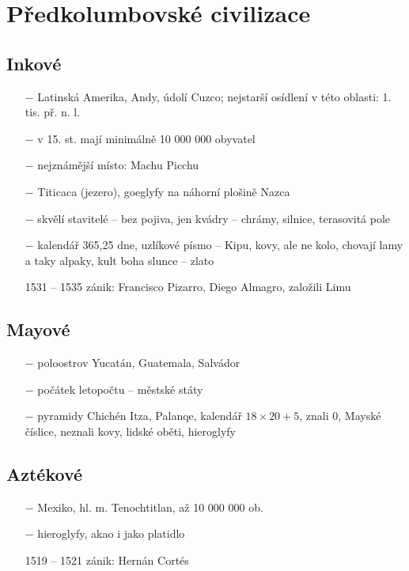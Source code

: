 \documentclass{article}
\begin{document}
\section*{Předkolumbovské civilizace}
\subsection*{Inkové}
\begin{itemize}
    \vspace{-0.5em}
    \setlength\itemsep{0.15em}
    \item[$-$] Latinská Amerika, Andy, údolí Cuzco; nejstarší osídlení v této oblasti: 1. tis. př. n. l.
    \item[$-$] v 15. st. mají minimálně 10 000 000 obyvatel
    \item[$-$] nejznámější místo: Machu Picchu
    \item[$-$] Titicaca (jezero), goeglyfy na náhorní plošině Nazca
    \item[$-$] skvělí stavitelé -- bez pojiva, jen kvádry -- chrámy, silnice, terasovitá pole
    \item[$-$] kalendář 365,25 dne, uzlíkové písmo -- Kipu, kovy, ale ne kolo, chovají lamy a taky alpaky, kult boha slunce -- zlato
    \item[1531 -- 1535] zánik: Francisco Pizarro, Diego Almagro, založili Limu

\end{itemize}

\subsection*{Mayové}
\begin{itemize}
    \vspace{-0.5em}
    \setlength\itemsep{0.15em}
    \item[$-$] poloostrov Yucatán, Guatemala, Salvádor
    \item[$-$] počátek letopočtu -- městské státy
    \item[$-$] pyramidy Chichén Itza, Palanqe, kalendář $18 \times 20 + 5$, znali 0, Mayské číslice, neznali kovy, lidské oběti, hieroglyfy

\end{itemize}

\subsection*{Aztékové}
\begin{itemize}
    \vspace{-0.5em}
    \setlength\itemsep{0.15em}
    \item[$-$] Mexiko, hl. m. Tenochtitlan, až 10 000 000 ob.
    \item[$-$] hieroglyfy, akao i jako platidlo
    \item[1519 -- 1521] zánik: Hernán Cortés

\end{itemize}
\end{document}

